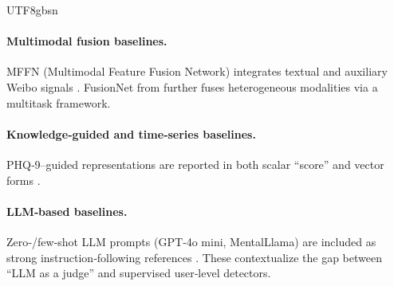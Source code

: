 \documentclass[lettersize,journal]{IEEEtran}
\renewcommand{\arraystretch}{0.99}
\begin{document}
\begin{CJK*}{UTF8}{gbsn}
\paragraph{Multimodal fusion baselines.}
MFFN (Multimodal Feature Fusion Network) integrates textual and auxiliary Weibo signals \cite{Wang2020IPCCC_MFFN}. FusionNet from \cite{Wang2022INS_WU3D} further fuses heterogeneous modalities via a multitask framework. 

\paragraph{Knowledge‑guided and time‑series baselines.}
PHQ‑9–guided representations are reported in both scalar “score” and vector forms \cite{Lan2025EMNLP, Cai2023ESWA}.

\paragraph{LLM‑based baselines.}
Zero‑/few‑shot LLM prompts (GPT‑4o mini, MentalLlama) are included as strong instruction‑following references \cite{Lan2025EMNLP}. These contextualize the gap between “LLM as a judge” and supervised user‑level detectors.


\begin{table}[t]
\centering
\caption{Key hyperparameters (fixed unless varied in ablations).}
\label{tab:hparams}
\renewcommand{\arraystretch}{1.1}
\end{table}
\end{CJK*}
\end{document}
